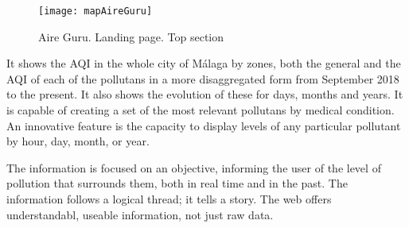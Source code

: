 \newpage
\begin{figure}[ht]
    \centering
    \texttt{[image: mapAireGuru]}
    \caption{Aire Guru. Landing page. Top section}
\end{figure}

It shows the AQI in the whole city of Málaga by zones, both the general and the AQI of each of the 
pollutans in a more disaggregated form from September 2018 to the present. It also shows the evolution
of these for days, months and years.
It is capable of creating a set of the most relevant pollutans by medical condition. An innovative feature is the capacity to display levels of any particular pollutant by hour, day, month, or year. 


\begin{itemize}
\done The information is focused on an objective, informing the user of the level of pollution that surrounds them, both  in real time
and in the past.
\done The information follows a logical thread; it tells a story.
\done The web offers understandabl, useable information, not just raw data.
\end{itemize}

\newpage